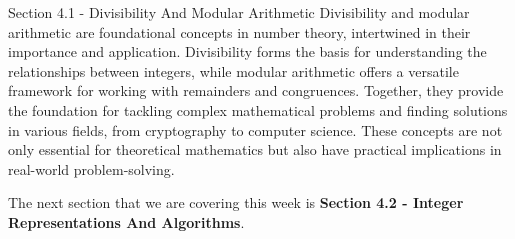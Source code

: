 \begin{notes}{Section 4.1 - Divisibility And Modular Arithmetic}
    Divisibility and modular arithmetic are foundational concepts in number theory, intertwined in their importance and application. Divisibility forms the basis for understanding the relationships 
    between integers, while modular arithmetic offers a versatile framework for working with remainders and congruences. Together, they provide the foundation for tackling complex mathematical problems 
    and finding solutions in various fields, from cryptography to computer science. These concepts are not only essential for theoretical mathematics but also have practical implications in real-world 
    problem-solving.
\end{notes}

The next section that we are covering this week is \textbf{Section 4.2 - Integer Representations And Algorithms}.

